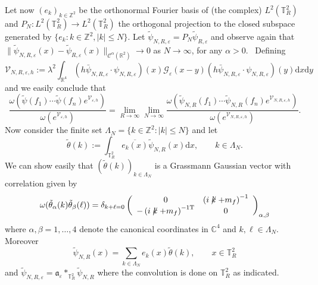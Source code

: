 \documentclass{article}
\newcommand{\Tau}{\mathrm{T}}
\newcommand{\assign}{:=}
\newcommand{\mathd}{\mathrm{d}}
\newcommand{\slashk}{\centernot{k}}
\begin{document}
Let now $(e_k)_{k \in \mathbb{Z}^2}$ be the orthonormal Fourier basis of (the
complex) $L^2 (\mathbb{T}_R^2)$ and $P_N : L^2 (\mathbb{T}_R^2) \rightarrow
L^2 (\mathbb{T}_R^2)$ the orthogonal projection to the closed subspace
generated by $\{ e_k : k \in \mathbb{Z}^2, | k | \leqslant N \}$. Let
$\tilde{\psi}_{N, R, \varepsilon} = P_N \tilde{\psi}_{R, \varepsilon}$ and
observe again that $\| \tilde{\psi}_{N, R, \varepsilon} (x) - \tilde{\psi}_{R,
\varepsilon} (x) \|_{\mathcal{C}^{\alpha} (\mathbb{R}^2)} \rightarrow 0$ as $N
\rightarrow \infty$, for any $\alpha > 0$. \ Defining
\[ \mathcal{V}_{N, R, \varepsilon, h} \assign \lambda^2 \int_{\mathbb{R}^4} (h
   \bar{\psi}_{N, R, \varepsilon} \cdot \psi_{N, R, \varepsilon}) (x)
   \mathcal{G}_{\varepsilon} (x - y) (h \bar{\psi}_{N, R, \varepsilon} \cdot
   \psi_{N, R, \varepsilon}) (y) \mathd x \mathd y \]
and we easily conclude that
\begin{equation}
  \frac{\omega (\tilde{\psi} (f_1) \cdots \tilde{\psi} (f_n)
  e^{\mathcal{V}_{\varepsilon, h}})}{\omega (e^{\mathcal{V}_{\varepsilon,
  h}})} = \lim_{R \rightarrow \infty} \lim_{N \rightarrow \infty} \frac{\omega
  (\tilde{\psi}_{N, R} (f_1) \cdots \tilde{\psi}_{N, R} (f_n)
  e^{\mathcal{V}_{N, R, \varepsilon, h}})}{\omega (e^{\mathcal{V}_{N, R,
  \varepsilon, h}})} \label{eq:euclidean-yukawa-fermion-periodic-galerkin} .
\end{equation}
Now consider the finite set $\Lambda_N = \{ k \in \mathbb{Z}^2 : | k |
\leqslant N \}$ and let
\[ \tilde{\theta} (k) \assign \int_{\mathbb{T}_R^2} \overline{e_k (x)}
   \tilde{\psi}_{N, R} (x) \mathd x, \qquad k \in \Lambda_N . \]
We can show easily that $(\tilde{\theta} (k))_{k \in \Lambda_N}$ is a
Grassmann Gaussian vector with correlation given by
\begin{equation}
  \omega (\tilde{\theta}_{\alpha} (k) \tilde{\theta}_{\beta} (\ell)) =
  \delta_{k + \ell = 0} \left(\begin{array}{cc}
    0 & \left( i \slashk + m_f \right)^{- 1}\\
    - \left( i \slashk + m_f \right)^{- 1 \Tau} & 0
  \end{array}\right)_{\alpha, \beta}
  \label{eq:free-corrrelation-fourier-galerkin}
\end{equation}
where $\alpha, \beta = 1, \ldots, 4$ denote the canonical coordinates in
$\mathbb{C}^4$ and $k, \ell \in \Lambda_N$. Moreover
\[ \tilde{\psi}_{N, R} (x) = \sum_{k \in \Lambda_N} e_k (x) \tilde{\theta}
   (k), \qquad x \in \mathbb{T}^2_R \]
and $\tilde{\psi}_{N, R, \varepsilon} = \mathfrak{a}_{\varepsilon}
\ast_{\mathbb{T}_R^2} \tilde{\psi}_{N, R}$ where the convolution is done on
$\mathbb{T}^2_R$ as indicated.
\end{document}
